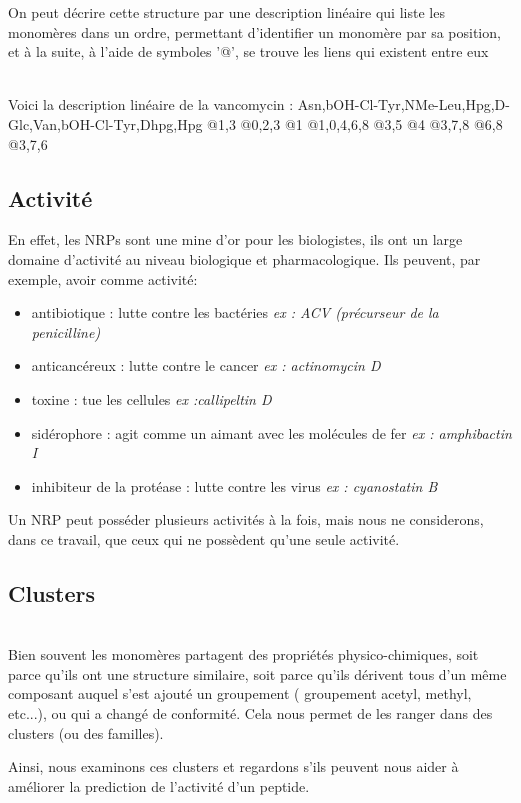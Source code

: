 \documentclass[a4paper,10pt]{report}
\begin{document}
	On peut décrire cette structure par une description linéaire qui liste les monomères dans un ordre, permettant d'identifier un monomère par sa position, et à la suite, à l'aide de symboles '@', se trouve les liens qui existent entre eux
	
	\\Voici la description linéaire de la vancomycin : Asn,bOH-Cl-Tyr,NMe-Leu,Hpg,D-Glc,Van,bOH-Cl-Tyr,Dhpg,Hpg @1,3 @0,2,3 @1 @1,0,4,6,8 @3,5 @4 @3,7,8 @6,8 @3,7,6 
	
	\subsection{Activité}
	
	En effet, les NRPs sont une mine d'or pour les biologistes, ils ont un large domaine d'activité au niveau biologique et pharmacologique. 
	Ils peuvent, par exemple, avoir comme activité:
	\begin{itemize}
	 \item antibiotique : lutte contre les bactéries \textit{ex : ACV (précurseur de la penicilline)}  
	 \item anticancéreux : lutte contre le cancer \textit{ex : actinomycin D}
	 \item toxine :  tue les cellules \textit{ex :callipeltin D}
	 \item sidérophore : agit comme un aimant avec les molécules de fer \textit{ex : amphibactin I}
	 \item inhibiteur de la protéase : lutte contre les virus \textit{ex : cyanostatin B}
	\end{itemize}
	Un NRP peut posséder plusieurs activités à la fois, mais nous ne considerons, dans ce travail, que ceux qui ne possèdent qu'une seule activité.
       
      \subsection{Clusters}
	
	~\\
	Bien souvent les monomères partagent des propriétés physico-chimiques, soit parce qu'ils ont une structure similaire, soit parce qu'ils dérivent tous d'un même composant auquel s'est ajouté un groupement ( groupement acetyl, methyl, etc...), ou qui a changé de conformité. Cela nous permet de les ranger dans des clusters (ou des familles).
	
	Ainsi, nous examinons ces clusters et regardons s'ils peuvent nous aider à améliorer la prediction de l'activité d'un peptide.
	
\end{document}
